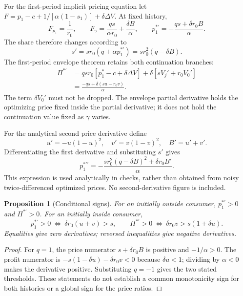 \documentclass[11pt]{article}
\newtheorem{proposition}{Proposition}
\begin{document}
For the first-period implicit pricing equation let
$F=p_1-c+1/[\alpha(1-s_1)]+\delta\Delta V$. At fixed history,
\[
 F_{p_1}=\frac1{r_0},\qquad
 F_\gamma=\frac{qs}{\alpha r_0}+\frac{\delta B}{\alpha},\qquad
 \boxed{p_1^{*\prime}=-\frac{qs+\delta r_0 B}{\alpha}}.
\]
The share therefore changes according to
\[
 s'=sr_0(q+\alpha p_1^{*\prime})=sr_0^2(q-\delta B).
\]
The first-period envelope theorem retains both continuation branches:
\begin{align*}
 \Pi^{*\prime}
 &=qsr_0[p_1^*-c+\delta\Delta V]+\delta[sV_j'+r_0V_0']\\
 &=\boxed{\frac{-qs+\delta(su-r_0v)}{\alpha}}.
\end{align*}
The term $\delta V_0'$ must not be dropped. The envelope partial derivative holds
the optimizing price fixed inside the partial derivative; it does not hold the
continuation value fixed as $\gamma$ varies.

For the analytical second price derivative define
\[
 u'=-u(1-u)^2,\quad v'=v(1-v)^2,\quad B'=u'+v'.
\]
Differentiating the first derivative and substituting $s'$ gives
\[
 \boxed{p_1^{*\prime\prime}
 =-\frac{sr_0^2(q-\delta B)^2+\delta r_0B'}{\alpha}}.
\]
This expression is used analytically in checks, rather than obtained from noisy
twice-differenced optimized prices. No second-derivative figure is included.

\begin{proposition}[Conditional signs]
For an initially outside consumer, $p_1^{*\prime}>0$ and $\Pi^{*\prime}>0$.
For an initially inside consumer,
\[
 p_1^{*\prime}>0\ \Longleftrightarrow\ \delta r_0(u+v)>s,\qquad
 \Pi^{*\prime}>0\ \Longleftrightarrow\ \delta r_0v>s(1+\delta u).
\]
Equalities give zero derivatives; reversed inequalities give negative derivatives.
\end{proposition}
\begin{proof}
For $q=1$, the price numerator $s+\delta r_0B$ is positive and $-1/\alpha>0$.
The profit numerator is $-s(1-\delta u)-\delta r_0v<0$ because $\delta u<1$;
dividing by $\alpha<0$ makes the derivative positive. Substituting $q=-1$
gives the two stated thresholds. These statements do not establish a common
monotonicity sign for both histories or a global sign for the price ratios.
\end{proof}
\end{document}
